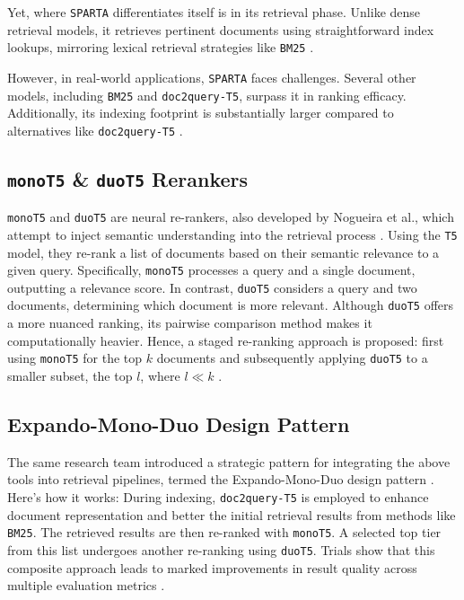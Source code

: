 \documentclass[sigconf]{acmart}
\begin{document}
Yet, where \texttt{SPARTA} differentiates itself is in its retrieval phase. Unlike dense retrieval models, it retrieves pertinent documents using straightforward index lookups, mirroring lexical retrieval strategies like \texttt{BM25} \cite{zhao2020sparta}.

However, in real-world applications, \texttt{SPARTA} faces challenges. Several other models, including \texttt{BM25} and \texttt{doc2query-T5}, surpass it in ranking efficacy. Additionally, its indexing footprint is substantially larger compared to alternatives like \texttt{doc2query-T5} \cite{thakur2021beir}.

\subsection*{\texttt{monoT5} \& \texttt{duoT5} Rerankers}\label{sec:rerankers}
\texttt{monoT5} and \texttt{duoT5} are neural re-rankers, also developed by Nogueira et al., which attempt to inject semantic understanding into the retrieval process \cite{nogueira2020document,nogueira2019multi}. Using the \texttt{T5} model, they re-rank a list of documents based on their semantic relevance to a given query. Specifically, \texttt{monoT5} processes a query and a single document, outputting a relevance score. In contrast, \texttt{duoT5} considers a query and two documents, determining which document is more relevant. Although \texttt{duoT5} offers a more nuanced ranking, its pairwise comparison method makes it computationally heavier. Hence, a staged re-ranking approach is proposed: first using \texttt{monoT5} for the top $k$ documents and subsequently applying \texttt{duoT5} to a smaller subset, the top $l$, where $l \ll k$ \cite{nogueira2019multi,pradeep2021expando}.


\subsection*{Expando-Mono-Duo Design Pattern}\label{sec:expando}
The same research team introduced a strategic pattern for integrating the above tools into retrieval pipelines, termed the Expando-Mono-Duo design pattern \cite{pradeep2021expando}. Here's how it works: During indexing, \texttt{doc2query-T5} is employed to enhance document representation and better the initial retrieval results from methods like \texttt{BM25}. The retrieved results are then re-ranked with \texttt{monoT5}. A selected top tier from this list undergoes another re-ranking using \texttt{duoT5}. Trials show that this composite approach leads to marked improvements in result quality across multiple evaluation metrics \cite{pradeep2021expando}.
\end{document}
